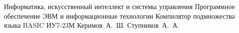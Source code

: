 \documentclass{bmstu-gost-7-32}
\begin{document}
\makecourseworktitle
	{Информатика, искусственный интеллект и системы управления} %
	{Программное обеспечение ЭВМ и информационные технологии} %
	{Компилятор подмножества языка BASIC} %
	{ИУ7-23М} %
	{Керимов~А.~Ш.} %
	{Ступников~А.~А.} %
	{} %
	{} %

%
%
%

%
%


\begin{MainPart}
	
	
	
\end{MainPart}




\end{document}
